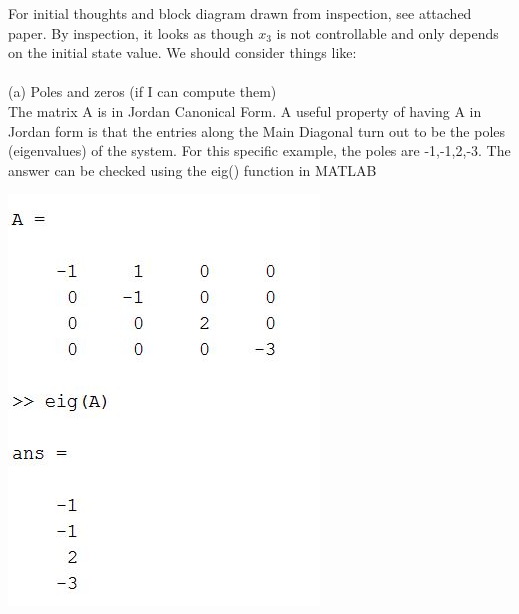 \documentclass[paper=a4,margin, fontsize=11pt]{scrartcl} %
\numberwithin{equation}{section} %
\numberwithin{figure}{section} %
\numberwithin{table}{section} %
\begin{document}
For initial thoughts and block diagram drawn from inspection, see attached paper.  By inspection, it looks as though $x_3$ is not controllable and only depends on the initial state value.  We should consider things like:\\
\\
(a) Poles and zeros (if I can compute them)\\
The matrix A is in Jordan Canonical Form.  A useful property of having A in Jordan form is that the entries along the Main Diagonal turn out to be the poles (eigenvalues) of the system.  For this specific example, the poles are -1,-1,2,-3.  The answer can be checked using the eig() function in MATLAB\\
\begin{center}
{\includegraphics{6a}}
\end{center}
\end{document}
